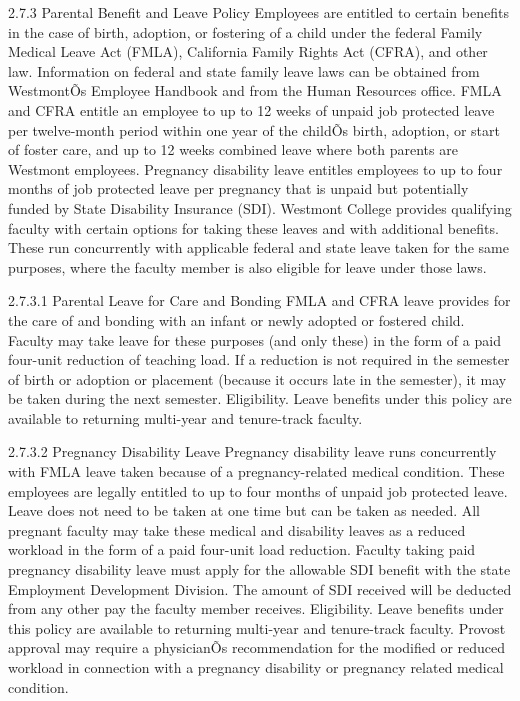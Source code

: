 \documentclass[letterpaper, 11pt]{article}
\begin{document}
2.7.3 Parental Benefit and Leave Policy
   Employees are entitled to certain benefits in the case of birth, adoption, or fostering of a child under the federal Family Medical Leave Act (FMLA), California Family Rights Act (CFRA), and other law. Information on federal and state family leave laws can be obtained from WestmontÕs Employee Handbook and from the Human Resources office. FMLA and CFRA entitle an employee to up to 12 weeks of unpaid job protected leave per twelve-month period within one year of the childÕs birth, adoption, or start of foster care, and up to 12 weeks combined leave where both parents are Westmont employees. Pregnancy disability leave entitles employees to up to four months of job protected leave per pregnancy that is unpaid but potentially funded by State Disability Insurance (SDI).
   Westmont College provides qualifying faculty with certain options for taking these leaves and with additional benefits. These run concurrently with applicable federal and state leave taken for the same purposes, where the faculty member is also eligible for leave under those laws.

2.7.3.1 Parental Leave for Care and Bonding
   FMLA and CFRA leave provides for the care of and bonding with an infant or newly adopted or fostered child. Faculty may take leave for these purposes (and only these) in the form of a paid four-unit reduction of teaching load. If a reduction is not required in the semester of birth or adoption or placement (because it occurs late in the semester), it may be taken during the next semester.
   Eligibility. Leave benefits under this policy are available to returning multi-year and tenure-track faculty.
   
2.7.3.2 Pregnancy Disability Leave
   Pregnancy disability leave runs concurrently with FMLA leave taken because of a pregnancy-related medical condition. These employees are legally entitled to up to four months of unpaid job protected leave. Leave does not need to be taken at one time but can be taken as needed. 
   All pregnant faculty may take these medical and disability leaves as a reduced workload in the form of a paid four-unit load reduction. Faculty taking paid pregnancy disability leave must apply for the allowable SDI benefit with the state Employment Development Division. The amount of SDI received will be deducted from any other pay the faculty member receives.
   Eligibility. Leave benefits under this policy are available to returning multi-year and tenure-track faculty. Provost approval may require a physicianÕs recommendation for the modified or reduced workload in connection with a pregnancy disability or pregnancy related medical condition.  
   
\end{document}
